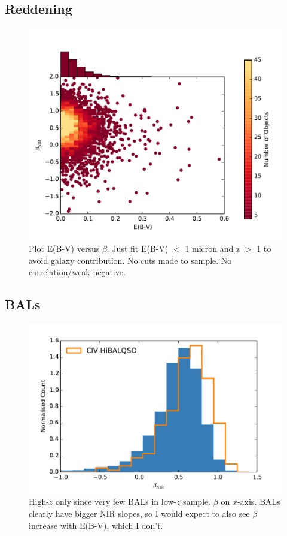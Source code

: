 \subsection{Reddening}

\begin{figure}
\centering
  \includegraphics[width=\columnwidth]{figures/chapter06/ebv_beta}
\caption{Plot E(B-V) versus $\beta$. Just fit E(B-V) $<$ 1 micron and z $>$ 1 to avoid galaxy contribution. No cuts made to sample. No correlation/weak negative.}
  \label{fig:fig}
\end{figure}

\subsection{BALs}

\begin{figure}
\centering
  \includegraphics[width=\columnwidth]{figures/chapter06/BALs_hist}
\caption{High-$z$ only since very few BALs in low-$z$ sample. $\beta$ on $x$-axis. BALs clearly have bigger NIR slopes, so I would expect to also see $\beta$ increase with E(B-V), which I don't.}
  \label{fig:fig}
\end{figure}

